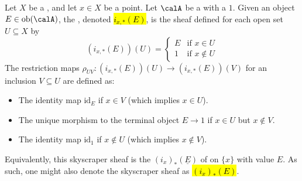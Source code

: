 \begin{definition} \label{definition:skyscraper_sheaf_of_a_topological_space_valued_in_a_category_with_a_terminal_object}
    Let $X$ be a , and let $x \in X$ be a point. Let $\calA$ be a  with a  $1$. 
    Given an object $E \in \text{ob}(\calA)$, the , denoted \hl{$i_{x,*}(E)$}, is the sheaf defined for each open set $U \subseteq X$ by
    \[
    (i_{x,*}(E))(U) = \begin{cases} 
    E & \text{if } x \in U \\
    1 & \text{if } x \notin U
    \end{cases}
    \]
    The restriction maps $\rho_{UV}: (i_{x,*}(E))(U) \to (i_{x,*}(E))(V)$ for an inclusion $V \subseteq U$ are defined as:
    \begin{itemize}
        \item The identity map $\text{id}_E$ if $x \in V$ (which implies $x \in U$).
        \item The unique morphism to the terminal object $E \to 1$ if $x \in U$ but $x \notin V$.
        \item The identity map $\text{id}_1$ if $x \notin U$ (which implies $x \notin V$).
    \end{itemize}

    Equivalently, this skyscraper sheaf is the  $(i_x)_*(\underline{E})$ of  on $\{x\}$ with value $E$. As such, one might also denote the skyscraper sheaf as \hl{$(i_x)_*(E)$}.
    
\end{definition}
